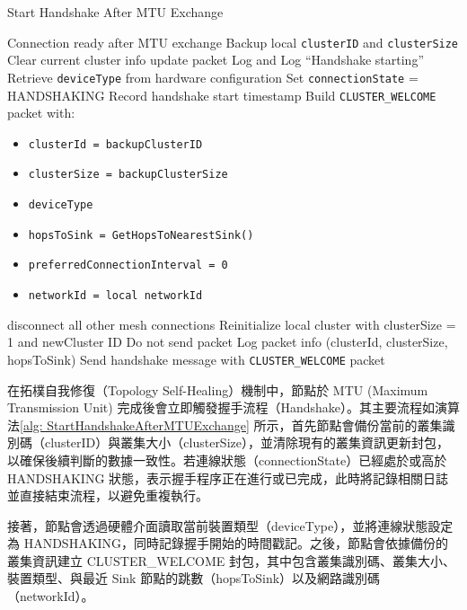 \begin{ZhChapter}
\begin{algorithm}[H]
\caption{Start Handshake After MTU Exchange}
\label{alg: StartHandshakeAfterMTUExchange}
\begin{algorithmic}[1]
\Require Connection ready after MTU exchange
\State Backup local \texttt{clusterID} and \texttt{clusterSize}
\State Clear current cluster info update packet
    \State Log and \Return {}
\EndIf
\State Log ``Handshake starting''
\State Retrieve \texttt{deviceType} from hardware configuration
\State Set \texttt{connectionState} = HANDSHAKING
\State Record handshake start timestamp
\State Build \texttt{CLUSTER\_WELCOME} packet with:
    \begin{itemize}
        \item \texttt{clusterId = backupClusterID}
        \item \texttt{clusterSize = backupClusterSize}
        \item \texttt{deviceType}
        \item \texttt{hopsToSink = GetHopsToNearestSink()}
        \item \texttt{preferredConnectionInterval = 0}
        \item \texttt{networkId = local networkId}
    \end{itemize}
    \State disconnect all other mesh connections
    \State Reinitialize local cluster with clusterSize = 1 and newCluster ID
    \State Do not send packet
\Else
    \State Log packet info (clusterId, clusterSize, hopsToSink)
    \State Send handshake message with \texttt{CLUSTER\_WELCOME} packet
\EndIf
\end{algorithmic}
\end{algorithm}

在拓樸自我修復（Topology Self-Healing）機制中，節點於 MTU (Maximum Transmission Unit) 完成後會立即觸發握手流程（Handshake）。其主要流程如演算法\ref{alg: StartHandshakeAfterMTUExchange} 所示，首先節點會備份當前的叢集識別碼（clusterID）與叢集大小（clusterSize），並清除現有的叢集資訊更新封包，以確保後續判斷的數據一致性。若連線狀態（connectionState）已經處於或高於 HANDSHAKING 狀態，表示握手程序正在進行或已完成，此時將記錄相關日誌並直接結束流程，以避免重複執行。

接著，節點會透過硬體介面讀取當前裝置類型（deviceType），並將連線狀態設定為 HANDSHAKING，同時記錄握手開始的時間戳記。之後，節點會依據備份的叢集資訊建立 CLUSTER\_WELCOME 封包，其中包含叢集識別碼、叢集大小、裝置類型、與最近 Sink 節點的跳數（hopsToSink）以及網路識別碼（networkId）。


\end{ZhChapter}
